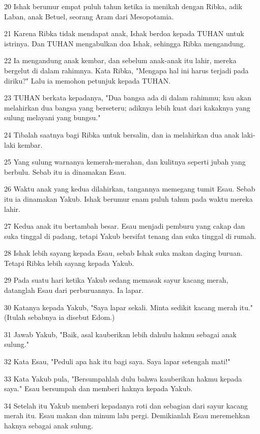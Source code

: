 \par 20 Ishak berumur empat puluh tahun ketika ia menikah dengan Ribka, adik Laban, anak Betuel, seorang Aram dari Mesopotamia.
\par 21 Karena Ribka tidak mendapat anak, Ishak berdoa kepada TUHAN untuk istrinya. Dan TUHAN mengabulkan doa Ishak, sehingga Ribka mengandung.
\par 22 Ia mengandung anak kembar, dan sebelum anak-anak itu lahir, mereka bergelut di dalam rahimnya. Kata Ribka, "Mengapa hal ini harus terjadi pada diriku?" Lalu ia memohon petunjuk kepada TUHAN.
\par 23 TUHAN berkata kepadanya, "Dua bangsa ada di dalam rahimmu; kau akan melahirkan dua bangsa yang berseteru; adiknya lebih kuat dari kakaknya yang sulung melayani yang bungsu."
\par 24 Tibalah saatnya bagi Ribka untuk bersalin, dan ia melahirkan dua anak laki-laki kembar.
\par 25 Yang sulung warnanya kemerah-merahan, dan kulitnya seperti jubah yang berbulu. Sebab itu ia dinamakan Esau.
\par 26 Waktu anak yang kedua dilahirkan, tangannya memegang tumit Esau. Sebab itu ia dinamakan Yakub. Ishak berumur enam puluh tahun pada waktu mereka lahir.
\par 27 Kedua anak itu bertambah besar. Esau menjadi pemburu yang cakap dan suka tinggal di padang, tetapi Yakub bersifat tenang dan suka tinggal di rumah.
\par 28 Ishak lebih sayang kepada Esau, sebab Ishak suka makan daging buruan. Tetapi Ribka lebih sayang kepada Yakub.
\par 29 Pada suatu hari ketika Yakub sedang memasak sayur kacang merah, datanglah Esau dari perburuannya. Ia lapar.
\par 30 Katanya kepada Yakub, "Saya lapar sekali. Minta sedikit kacang merah itu." (Itulah sebabnya ia disebut Edom.)
\par 31 Jawab Yakub, "Baik, asal kauberikan lebih dahulu hakmu sebagai anak sulung."
\par 32 Kata Esau, "Peduli apa hak itu bagi saya. Saya lapar setengah mati!"
\par 33 Kata Yakub pula, "Bersumpahlah dulu bahwa kauberikan hakmu kepada saya." Esau bersumpah dan memberi haknya kepada Yakub.
\par 34 Setelah itu Yakub memberi kepadanya roti dan sebagian dari sayur kacang merah itu. Esau makan dan minum lalu pergi. Demikianlah Esau meremehkan haknya sebagai anak sulung.

